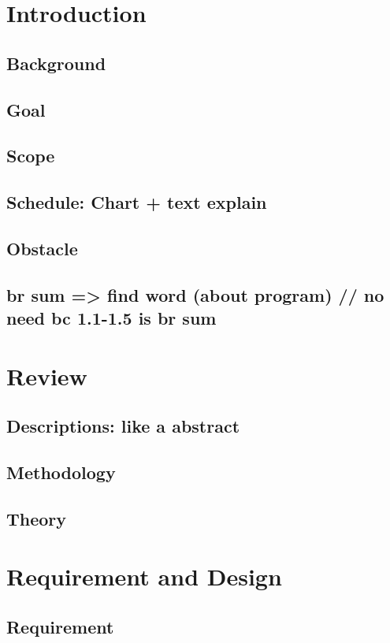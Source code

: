\documentclass[11pt]{article}
\begin{document}

\section{Introduction}
	\subsection{Background}
	\subsection{Goal}
	\subsection{Scope}
	\subsection{Schedule: Chart + text explain}
	\subsection{Obstacle}
	\subsection{br sum => find word (about program) // no need bc 1.1-1.5 is br sum}
	\section{Review}
	\subsection{Descriptions: like a abstract}
	\subsection{Methodology} 
	\subsection{Theory}
\section{Requirement and Design}
	\subsection{Requirement}
\end{document}
